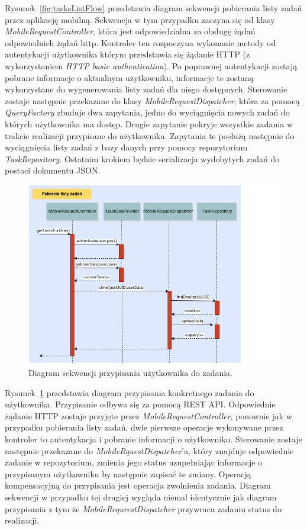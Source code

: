 Rysunek~\ref{fig:tasksListFlow} przedstawia diagram sekwencji pobierania listy zadań przez aplikację mobilną. Sekwencja w tym przypadku zaczyna się od klasy \textit{MobileRequestController}, która jest odpowiedzialna za obsługę żądań odpowiednich żądań http. Kontroler ten rozpoczyna wykonanie metody od autentykacji użytkownika którym przedstawia się żądanie HTTP (z wykorzystaniem \textit{HTTP basic authentication}). Po poprawnej autentykacji zostają pobrane informacje o aktualnym użytkowniku, informacje te zostaną wykorzystane do wygenerowania listy zadań dla niego dostępnych.  Sterowanie zostaje następnie przekazane do klasy \textit{MobileRequestDispatcher}, która za pomocą \textit{QueryFactory} zbuduje dwa zapytania, jedno do wyciągnięcia nowych zadań do których użytkownika ma dostęp. Drugie zapytanie pokryje wszystkie zadania w trakcie realizacji przypisane do użytkownika. Zapytania te posłużą następnie do wyciągnięcia listy zadań z bazy danych przy pomocy repozytorium \textit{TaskRepository}. Ostatnim krokiem będzie serializacja wydobytych zadań do postaci dokumentu JSON. 

\begin{figure}[h]
\centerline{\includegraphics[scale=0.5]{climeTaskFlow}}
\caption{Diagram sekwencji przypisania użytkownika do zadania.}
\label{fig:climeTaskFlow}
\end{figure}

Rysunek~\ref{fig:climeTaskFlow} przedstawia diagram przypisania konkretnego zadania do użytkownika. Przypisanie odbywa się za pomocą REST API. Odpowiednie żądanie HTTP zostaje przyjęte przez \textit{MobileRequestController}, ponownie jak w przypadku pobierania listy zadań, dwie pierwsze operacje wykonywane przez kontroler to autentykacja i pobranie informacji o użytkowniku. Sterowanie zostaje następnie przekazane do \textit{MobileRquestDispatcher}'a, który znajduje odpowiednie zadanie w repozytorium, zmienia jego status uzupełniając informacje o przypisanym użytkowniku by następnie zapisać te zmiany. Operacją kompensacyjną do przypisania jest operacja zwolnienia zadania. Diagram sekwencji w przypadku tej drugiej wygląda niemal identycznie jak diagram przypisania z tym że \textit{MobileRequrestDispatcher} przywraca zadaniu status do realizacji. 

